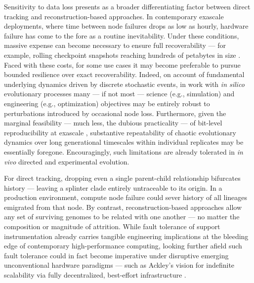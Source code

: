 Sensitivity to data loss presents as a broader differentiating factor between direct tracking and reconstruction-based approaches.
In contemporary exascale deployments, where time between node failures drops as low as hourly, hardware failure has come to the fore as a routine inevitability.
Under these conditions, massive expense can become necessary to ensure full recoverability --- for example, rolling checkpoint snapshots reaching hundreds of petabytes in size \citep{gordonbellTODO}.
Faced with these costs, for some use cases it may become preferable to pursue bounded resilience over exact recoverability.
Indeed, on account of fundamental underlying dynamics driven by discrete stochastic events, in work with \textit{in silico} evolutionary processes many --- if not most --- science (e.g., simulation) and engineering (e.g., optimization) objectives may be entirely robust to perturbations introduced by occasional node loss.
Furthermore, given the marginal feasibility --- much less, the dubious practicality --- of bit-level reproducibility at exascale \citep{TODO}, substantive repeatability of chaotic evolutionary dynamics over long generational timescales within individual replicates may be essentially foregone.
Encouragingly, such limitations are already tolerated in \textit{in vivo} directed and experimental evolution.

For direct tracking, dropping even a single parent-child relationship bifurcates history --- leaving a splinter clade entirely untraceable to its origin.
In a production environment, compute node failure could sever history of all lineages emigrated from that node.
By contrast, reconstruction-based approaches allow any set of surviving genomes to be related with one another --- no matter the composition or magnitude of attrition.
While fault tolerance of support instrumentation already carries tangible engineering implications at the bleeding edge of contemporary high-performance computing, looking further afield such fault tolerance could in fact become imperative under disruptive emerging unconventional hardware paradigms --- such as Ackley's vision for indefinite scalability via fully decentralized, best-effort infrastructure \citep{TODOackley}.

